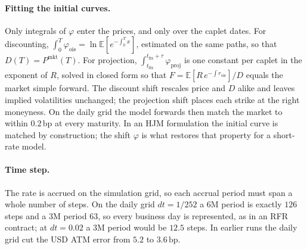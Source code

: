 \documentclass[11pt]{article}
\newcommand{\bp}{\,\text{bp}}
\begin{document}
\paragraph{Fitting the initial curves.} Only integrals of \(\varphi\) enter the prices, and only
over the caplet dates. For discounting,
\(\int_0^T\varphi_{\text{ois}} = \ln\mathbb{E}[e^{-\int_0^T x}]\), estimated on the same paths, so
that \(D(T)=P^{\text{mkt}}(T)\). For projection, \(\int_{t_{\text{fix}}}^{t_{\text{fix}}+\tau}
\varphi_{\text{proj}}\) is one constant per caplet in the exponent of \(R\), solved in closed form
so that \(F=\mathbb{E}[R\,e^{-\int r_{\text{ois}}}]/D\) equals the market simple forward. The
discount shift rescales price and \(D\) alike and leaves implied volatilities unchanged; the
projection shift places each strike at the right moneyness. On the daily grid the model forwards
then match the market to within \(0.2\bp\) at every maturity. In an HJM formulation the initial
curve is matched by construction; the shift \(\varphi\) is
what restores that property for a short-rate model.

\paragraph{Time step.} The rate is accrued on the simulation grid, so each accrual period must span
a whole number of steps. On the daily grid \(dt=1/252\) a \(6\)M period is exactly \(126\) steps and
a \(3\)M period \(63\), so every business day is represented, as in an RFR contract; at \(dt=0.02\) a
\(3\)M period would be \(12.5\) steps. In earlier runs the daily grid cut the USD ATM error from
\(5.2\) to \(3.6\bp\).
\end{document}
